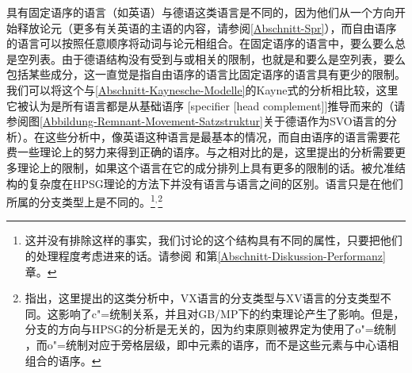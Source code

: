 具有固定语序的语言（如英语）与德语这类语言是不同的，因为他们从一个方向开始释放论元（更多有关英语的主语的内容，请参阅\ref{Abschnitt-Spr}），而自由语序的语言可以按照任意顺序将动词与论元相组合。在固定语序的语言中，要么要么总是空列表。由于德语结构没有受到与或相关的限制，也就是和要么是空列表，要么包括某些成分，这一直觉是指自由语序的语言比固定语序的语言具有更少的限制。我们可以将这个与\ref{Abschnitt-Kaynesche-Modelle}的Kayne式的分析相比较，这里它被认为是所有语言都是从基础语序 [specifier [head complement]]推导而来的（请参阅图\vref{Abbildung-Remnant-Movement-Satzstruktur}关于德语作为SVO语言的分析\citep{Laenzlinger2004a}）。在这些分析中，像英语这种语言是最基本的情况，而自由语序的语言需要花费一些理论上的努力来得到正确的语序。与之相对比的是，这里提出的分析需要更多理论上的限制，如果这个语言在它的成分排列上具有更多的限制的话。被允准结构的复杂度在HPSG理论的方法下并没有语言与语言之间的区别。语言只是在他们所属的分支类型上是不同的。\footnote{%
这并没有排除这样的事实，我们讨论的这个结构具有不同的属性，只要把他们的处理程度考虑进来的话。请参阅 和第\ref{Abschnitt-Diskussion-Performanz}章。
}$^,$\footnote{%
 \citet[]{Haider97c}指出，这里提出的这类分析中，VX语言的分支类型与XV语言的分支类型不同。这影响了c"=统制关系，并且对GB/MP下的约束理论产生了影响。但是，分支的方向与HPSG的分析是无关的，因为约束原则被界定为使用了o"=统制
    \citep[\S~6]{ps2}，而o"=统制对应于旁格层级，即\subcatlc 中元素的语序，而不是这些元素与中心语相组合的语序。
}
